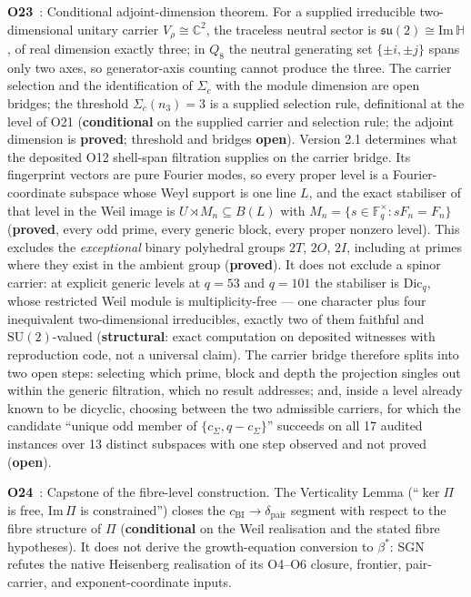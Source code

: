 \documentclass[11pt,a4paper]{article}
\newcommand{\sproved}{\textcolor{cproved}{\textbf{proved}}}
\newcommand{\sstruct}{\textcolor{cstruct}{\textbf{structural}}}
\newcommand{\sopen}{\textcolor{copen}{\textbf{open}}}
\newcommand{\scond}{\textcolor{ccond}{\textbf{conditional}}}
\begin{document}
    \textbf{O23}~\cite{Beau2026a27}: Conditional adjoint-dimension theorem.
    For a supplied irreducible two-dimensional unitary carrier $V_\rho\cong\mathbb{C}^2$, the
    traceless neutral sector is $\mathfrak{su}(2)\cong\mathrm{Im}\,\mathbb{H}$, of real dimension
    exactly three; in $Q_8$ the neutral generating set $\{\pm i,\pm j\}$ spans only two axes, so
    generator-axis counting cannot produce the three.
    The carrier selection and the identification of $\Sigma_c$ with the module dimension are open
    bridges; the threshold $\Sigma_c(n_3)=3$ is a supplied selection rule, definitional at the
    level of O21 (\scond{} on the supplied carrier and selection rule; the adjoint dimension is
    \sproved; threshold and bridges \sopen).
    Version 2.1 determines what the deposited O12 shell-span filtration supplies on the carrier
    bridge.
    Its fingerprint vectors are pure Fourier modes, so every proper level is a Fourier-coordinate
    subspace whose Weyl support is one line $L$, and the exact stabiliser of that level in the
    Weil image is $U\rtimes M_n\subseteq B(L)$ with
    $M_n=\{s\in\mathbb{F}_q^\times : sF_n=F_n\}$ (\sproved, every odd prime, every generic
    block, every proper nonzero level).
    This excludes the \emph{exceptional} binary polyhedral groups $2T$, $2O$, $2I$, including at
    primes where they exist in the ambient group (\sproved).
    It does not exclude a spinor carrier: at explicit generic levels at $q=53$ and $q=101$ the
    stabiliser is $\mathrm{Dic}_q$, whose restricted Weil module is multiplicity-free --- one
    character plus four inequivalent two-dimensional irreducibles, exactly two of them faithful
    and $\mathrm{SU}(2)$-valued (\sstruct{}: exact computation on deposited witnesses with reproduction code, not a
    universal claim).
    The carrier bridge therefore splits into two open steps: selecting which prime, block and
    depth the projection singles out within the generic filtration, which no result addresses;
    and, inside a level already known to be dicyclic, choosing between the two admissible
    carriers, for which the candidate ``unique odd member of $\{c_\Sigma,q-c_\Sigma\}$''
    succeeds on all 17 audited instances over 13 distinct subspaces with one step observed and
    not proved (\sopen).

    \textbf{O24}~\cite{Beau2026a28}: Capstone of the fibre-level construction.
    The Verticality Lemma (``$\ker\Pi$ is free, $\mathrm{Im}\,\Pi$ is constrained'') closes the
    $c_{\mathrm{BI}} \to \delta_{\mathrm{pair}}$ segment with respect to the fibre structure of $\Pi$
    (\scond{} on the Weil realisation and the stated fibre hypotheses).
    It does not derive the growth-equation conversion to $\beta^*$: SGN refutes the native
    Heisenberg realisation of its O4--O6 closure, frontier, pair-carrier, and exponent-coordinate
    inputs.
\end{document}
